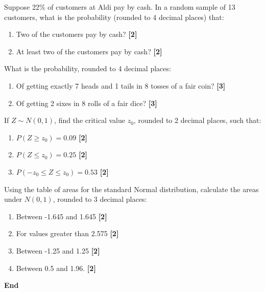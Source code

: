 \documentclass[a4paper, leqno, 12pt]{article} %
\newenvironment{top_enumerate}{
\begin{enumerate}
  \setlength{\itemsep}{2em}
  \setlength{\topsep}{-0pt}
  \setlength{\partopsep}{-0pt}
}{\end{enumerate}}
\begin{document}
\begin{top_enumerate}

\item Suppose {22}\% of customers at Aldi pay by cash. In a random sample of {13} customers, what is the probability (rounded to 4 decimal places) that:
 
\setcounter{equation}{0}  %
\begin{enumerate}
	\setlength{\topsep}{-0pt}
	\setlength{\partopsep}{-0pt}
	\setlength{\itemsep}{10pt}
			\item Two of the customers pay by cash?
	 \quad \textbf{[2]}
		\item At least two of the customers pay by cash?
	 \quad \textbf{[2]}
\end{enumerate}\item What is the probability, rounded to 4 decimal places:
 
\setcounter{equation}{0}  %
\begin{enumerate}
	\setlength{\topsep}{-0pt}
	\setlength{\partopsep}{-0pt}
	\setlength{\itemsep}{10pt}
			\item Of getting exactly {7} heads and {1} tails in {8} tosses of a fair coin?
	 \quad \textbf{[3]}
		\item Of getting {2} sixes in {8} rolls of a fair dice?
	 \quad \textbf{[3]}
\end{enumerate}\item If $Z \sim N(0,1)$, find the critical value $z_0$, rounded to 2 decimal places, such that:
 
\setcounter{equation}{0}  %
\begin{enumerate}
	\setlength{\topsep}{-0pt}
	\setlength{\partopsep}{-0pt}
	\setlength{\itemsep}{10pt}
			\item $P(Z \ge z_0) = {0.09}$
	 \quad \textbf{[2]}
		\item $P(Z \le z_0) = {0.25}$
	 \quad \textbf{[2]}
		\item $P(-z_0 \le Z \le z_0) = {0.53}$
	 \quad \textbf{[2]}
\end{enumerate}\item Using the table of areas for the standard Normal distribution, calculate the areas under $N(0,1)$, rounded to 3 decimal places:
 
\setcounter{equation}{0}  %
\begin{enumerate}
	\setlength{\topsep}{-0pt}
	\setlength{\partopsep}{-0pt}
	\setlength{\itemsep}{10pt}
			\item Between {-1.645} and {1.645}
	 \quad \textbf{[2]}
		\item For values greater than {2.575}
	 \quad \textbf{[2]}
		\item Between {-1.25} and {1.25}
	 \quad \textbf{[2]}
		\item Between {0.5} and {1.96}.
	 \quad \textbf{[2]}
\end{enumerate}

\end{top_enumerate}

\rfoot{}                %
\begin{flushright}      %
\textbf{End}
\end{flushright}
\end{document}

